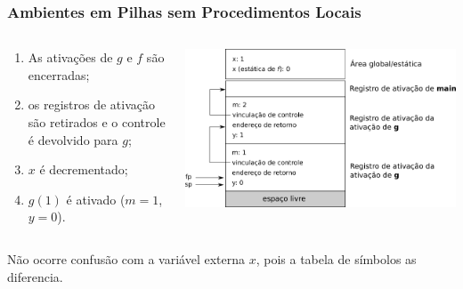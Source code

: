 \documentclass[table]{beamer}
\begin{document}
\begin{frame}[fragile]
   \frametitle{Ambientes em Pilhas sem Procedimentos Locais}
   \begin{columns}
   \begin{column}{0.4\textwidth}
   \scriptsize
   \begin{enumerate}
      \item As ativações de $g$ e $f$ são encerradas;
      \item os registros de ativação são retirados e o controle é devolvido para $g$;
      \item $x$ é decrementado;
      \item $g(1)$ é ativado ($m=1$, $y=0$).
   \end{enumerate}
   \end{column}
   \begin{column}{0.6\textwidth}
   \includegraphics[scale=0.3]{figuras/ambientebaseadoempilhas03.png}
   \end{column}
   \end{columns}
   \vspace{1.0cm}
   Não ocorre confusão com a variável externa $x$, pois a tabela de símbolos as diferencia.
\end{frame}
\end{document}
